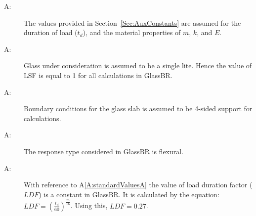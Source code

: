 \documentclass[12pt]{article}
\newcounter{assumpnum}
\newcommand{\atheassumpnum}{A\theassumpnum}
\begin{document}
\begin{description}
\item[\atheassumpnum\label{A:standardValuesA}:]The values provided in Section~\ref{Sec:AuxConstants} are assumed for the duration of load (${t_{d}}$), and the material properties of $m$, $k$, and $E$.
\end{description}
\begin{description}
\item[\atheassumpnum\label{A:glassLiteA}:]Glass under consideration is assumed to be a single lite. Hence the value of LSF is equal to 1 for all calculations in GlassBR.
\end{description}
\begin{description}
\item[\atheassumpnum\label{A:bndryConditionsA}:]Boundary conditions for the glass slab is assumed to be 4-sided support for calculations.
\end{description}
\begin{description}
\item[\atheassumpnum\label{A:responseTyA}:]The response type considered in GlassBR is flexural.
\end{description}
\begin{description}
\item[\atheassumpnum\label{A:ldfConstantA}:]With reference to A\ref{A:standardValuesA} the value of load duration factor ($LDF$) is a constant in GlassBR. It is calculated by the equation: $LDF=\left(\frac{{t_{d}}}{60}\right)^{\frac{m}{16}}$. Using this, $LDF=0.27$.
\end{description}
\end{document}
